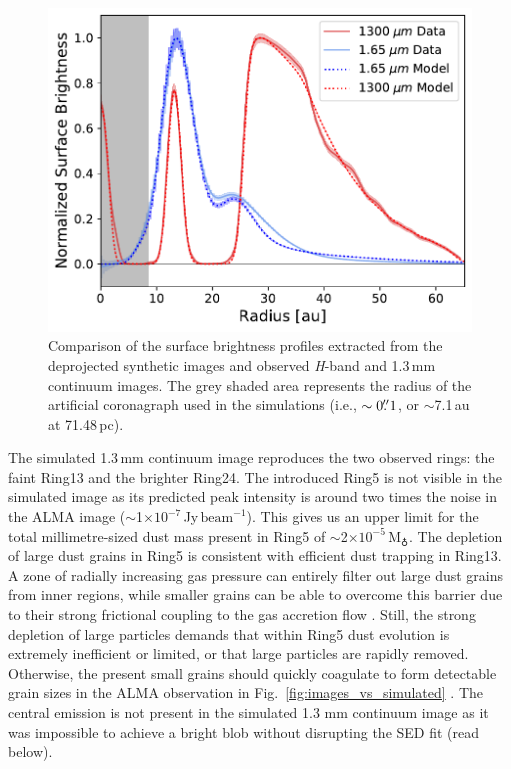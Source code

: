 \documentclass[fleqn,usenatbib,useAMS]{mnras}
\begin{document}
\begin{figure}
	\includegraphics[width=\columnwidth]{comp_fig_all_profiles_au.pdf}
    \caption{Comparison of the surface brightness profiles extracted from the deprojected synthetic images and observed \textit{H}-band and 1.3\,mm continuum images. The grey shaded area represents the radius of the artificial coronagraph used in the simulations (i.e., $\sim0\hbox{$.\!\!^{\prime\prime}$} 1$, or $\sim$7.1\,au at 71.48\,pc).}
    \label{fig:radprofiles}
\end{figure}

The simulated 1.3\,mm continuum image reproduces the two observed rings: the faint Ring13 and the brighter Ring24. The introduced Ring5 is not visible in the simulated image as its predicted peak intensity is around two times the noise in the ALMA image ($\sim$1$\times10^{-7}$\,Jy\,$\mathrm{beam}^{-1}$). This gives us an upper limit for the total millimetre-sized dust mass present in Ring5 of $\sim$2$\times10^{-5}$\,M$_{\earth}$. The depletion of large dust grains in Ring5 is consistent with efficient dust trapping in Ring13. A zone of radially increasing gas pressure can entirely filter out large dust grains from inner regions, while smaller grains can be able to overcome this barrier due to their strong frictional coupling to the gas accretion flow \citep[studied in the context of planetary gaps,][]{Rice2006,Zhu2012,Weber2018}. Still, the strong depletion of large particles demands that within Ring5 dust evolution is extremely inefficient or limited, or that large particles are rapidly removed. Otherwise, the present small grains should quickly coagulate to form detectable grain sizes in the ALMA observation in Fig.~\ref{fig:images_vs_simulated} \citep{Drazkowska2019}. The central emission is not present in the simulated 1.3 mm continuum image as it was impossible to achieve a bright blob without disrupting the SED fit (read below).
\end{document}
